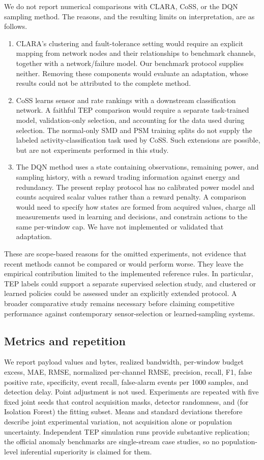 \documentclass[12pt]{article}
\begin{document}
We do not report numerical comparisons with CLARA, CoSS, or the DQN sampling
method. The reasons, and the resulting limits on interpretation, are as follows.
\begin{enumerate}[leftmargin=*]
\item CLARA's clustering and fault-tolerance setting \cite{harb2024clara} would
require an explicit mapping from network nodes and their relationships to
benchmark channels, together with a network/failure model. Our benchmark
protocol supplies neither. Removing these components would evaluate an
adaptation, whose results could not be attributed to the complete method.
\item CoSS \cite{liu2026coss} learns sensor and rate rankings with a downstream
classification network. A faithful TEP comparison would require a separate
task-trained model, validation-only selection, and accounting for the data
used during selection. The normal-only SMD and PSM training splits do not
supply the labeled activity-classification task used by CoSS. Such extensions
are possible, but are not experiments performed in this study.
\item The DQN method \cite{huang2025dqn} uses a state containing observations,
remaining power, and sampling history, with a reward trading information
against energy and redundancy. The present replay protocol has no calibrated
power model and counts acquired scalar values rather than a reward penalty.
A comparison would need to specify how states are formed from acquired values,
charge all measurements used in learning and decisions, and constrain actions
to the same per-window cap. We have not implemented or validated that adaptation.
\end{enumerate}
These are scope-based reasons for the omitted experiments, not evidence that
recent methods cannot be compared or would perform worse. They leave the
empirical contribution limited to the implemented reference rules. In particular,
TEP labels could support a separate supervised selection study, and clustered
or learned policies could be assessed under an explicitly extended protocol.
A broader comparative study remains necessary before claiming competitive
performance against contemporary sensor-selection or learned-sampling systems.

\subsection{Metrics and repetition}

We report payload values and bytes, realized bandwidth, per-window budget
excess, MAE, RMSE, normalized per-channel RMSE, precision, recall, F1, false
positive rate, specificity, event recall, false-alarm events per 1000 samples,
and detection delay. Point adjustment is not used. Experiments are repeated
with five fixed joint seeds that control acquisition masks, detector randomness,
and (for Isolation Forest) the fitting subset. Means and standard deviations
therefore describe joint experimental variation, not acquisition alone or
population uncertainty. Independent TEP simulation
runs provide substantive replication; the official anomaly benchmarks are
single-stream case studies, so no population-level inferential superiority is
claimed for them.
\end{document}
